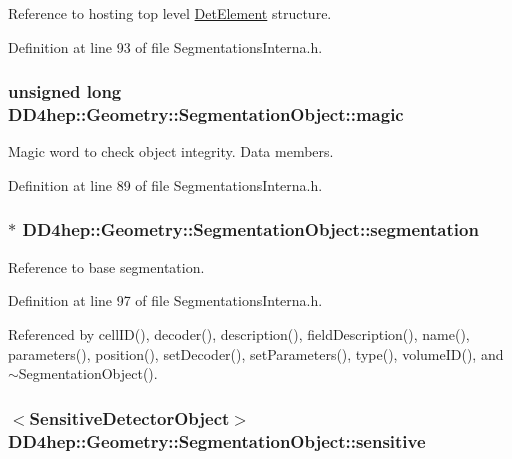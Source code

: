 Reference to hosting top level \hyperlink{class_d_d4hep_1_1_geometry_1_1_det_element}{DetElement} structure. 

Definition at line 93 of file SegmentationsInterna.h.\hypertarget{class_d_d4hep_1_1_geometry_1_1_segmentation_object_a2fb8a80e389d915e7c74499f09fd341b}{
\subsubsection[{magic}]{\setlength{\rightskip}{0pt plus 5cm}unsigned long {\bf DD4hep::Geometry::SegmentationObject::magic}}}
\label{class_d_d4hep_1_1_geometry_1_1_segmentation_object_a2fb8a80e389d915e7c74499f09fd341b}


Magic word to check object integrity. Data members. 

Definition at line 89 of file SegmentationsInterna.h.\hypertarget{class_d_d4hep_1_1_geometry_1_1_segmentation_object_a96eb25f8256d85ec907729f371ad315c}{
\subsubsection[{segmentation}]{$\ast$ {\bf DD4hep::Geometry::SegmentationObject::segmentation}}}
\label{class_d_d4hep_1_1_geometry_1_1_segmentation_object_a96eb25f8256d85ec907729f371ad315c}


Reference to base segmentation. 

Definition at line 97 of file SegmentationsInterna.h.

Referenced by cellID(), decoder(), description(), fieldDescription(), name(), parameters(), position(), setDecoder(), setParameters(), type(), volumeID(), and $\sim$SegmentationObject().\hypertarget{class_d_d4hep_1_1_geometry_1_1_segmentation_object_ae62042fd318764e7744b87de21cb25ad}{
\subsubsection[{sensitive}]{$<${\bf SensitiveDetectorObject}$>$ {\bf DD4hep::Geometry::SegmentationObject::sensitive}}}
\label{class_d_d4hep_1_1_geometry_1_1_segmentation_object_ae62042fd318764e7744b87de21cb25ad}


